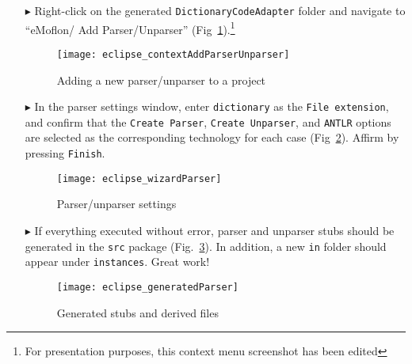 \begin{itemize}

\item[$\blacktriangleright$] Right-click on the generated \texttt{DictionaryCodeAdapter} folder and navigate to ``eMoflon/ Add Parser/Unparser''
(Fig~\ref{eclipse:contextParser}).\footnote{For presentation purposes, this context menu screenshot has been edited}

\vspace{0.5cm}

\begin{figure}[htpb]
\begin{center}
  \texttt{[image: eclipse\_contextAddParserUnparser]}
  \caption{Adding a new parser/unparser to a project}
  \label{eclipse:contextParser}
\end{center}
\end{figure}


\item[$\blacktriangleright$] In the parser settings window, enter \texttt{dictionary} as the \texttt{File exten\-si\-on}, and confirm that the \texttt{Create
Parser}, \texttt{Create Unparser}, and \texttt{ANTLR} options are selected as the corresponding technology for each case (Fig~\ref{eclipse:wizardParser}).
Affirm by pressing \texttt{Finish}.

\begin{figure}[htpb]
\begin{center}
  \texttt{[image: eclipse\_wizardParser]}
  \caption{Parser/unparser settings}
  \label{eclipse:wizardParser}
\end{center}
\end{figure}


\item[$\blacktriangleright$] If everything executed without error, parser and unparser stubs should be generated in the \texttt{src} package
(Fig.~\ref{eclipse:generatedParser}). In addition, a new \texttt{in} folder should appear under \texttt{instances}. Great work!

\begin{figure}[htpb]
\begin{center}
  \texttt{[image: eclipse\_generatedParser]}
  \caption{Generated stubs and derived files}
  \label{eclipse:generatedParser}
\end{center}
\end{figure}

\end{itemize}
